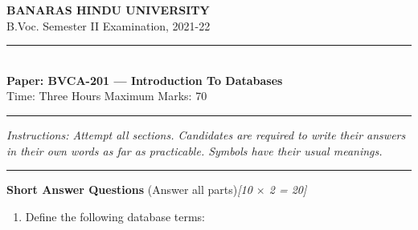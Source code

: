 \documentclass[11pt,a4paper]{article}
\newcommand{\pts}[1]{\hfill   \textit{[#1]}}
\begin{document}
\begin{center}
  {\large\bfseries BANARAS HINDU UNIVERSITY}\\[2pt]
  {\normalsize B.Voc. Semester II Examination, 2021-22}\\[6pt]
  \rule{0.8\linewidth}{0.5pt}\\[6pt]
  {\large\bfseries Paper: BVCA-201 --- Introduction To Databases}\\[4pt]
  {\normalsize Time: Three Hours \hfill Maximum Marks: 70}
\end{center}

\rule{\linewidth}{0.4pt}

\smallskip



\noindent   \textit{Instructions: Attempt all sections. Candidates are required to write their answers in their own words as far as practicable. Symbols have their usual meanings.}

\bigskip

\bigskip



\rule{\linewidth}{0.4pt}\smallskip




\noindent   \textbf{Short Answer Questions} (Answer all parts)\pts{10 $ \times$ 2 = 20}

\begin{enumerate}[label=\arabic*.,leftmargin=*,itemsep=8pt]
  \item Define the following database terms:
  
\end{enumerate}

\bigskip


\end{document}
